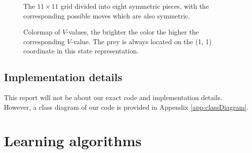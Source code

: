 \documentclass{article}
\begin{document}
\begin{figure}[htbp]
        \caption{\label{statespaceSymm} The $11 \times 11$ grid divided into eight symmetric pieces, with the corresponding possible moves which are also symmetric.}

        \caption{\label{NewStateRep} Colormap of $V$-values, the brighter the color the higher the corresponding $V$-value. The prey is always located on the (1, 1) coordinate in this state representation.}
\end{figure}


\subsection{Implementation details}
This report will not be about our exact code and implementation details. However, a class diagram of our code is provided in Appendix \ref{app:classDiagram}.

\section{Learning algorithms}
\end{document}
